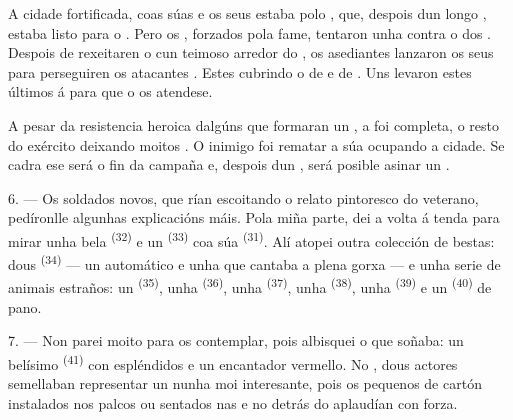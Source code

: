 A cidade fortificada, coas súas  e os seus  estaba
 polo , que, despois dun longo
, estaba listo para o . Pero os ,
forzados pola fame, tentaron unha  contra o  dos
. Despois de rexeitaren o  cun 
teimoso arredor do , os asediantes  lanzaron os
seus  para perseguiren os atacantes . Estes
 cubrindo o  de  e de
. Uns  levaron estes últimos á 
para que o  os atendese.

A pesar da resistencia heroica dalgúns  que formaran un
, a  foi completa, o resto do exército 
deixando moitos . O inimigo foi rematar a súa 
ocupando a cidade. Se cadra ese será o fin da campaña e, despois dun
, será posible asinar un .

\VUsaut{4.4mm}
\VUsaut{2.8mm}

6. --- Os soldados novos, que rían escoitando o relato pintoresco do veterano,
pedíronlle algunhas explicacións máis. Pola miña parte, dei a volta á tenda para mirar
unha bela  \textsuperscript{(32)} e un 
\textsuperscript{(33)} coa súa  \textsuperscript{(31)}. Alí atopei
outra colección de bestas: dous  \textsuperscript{(34)} ---
un  automático e unha  que cantaba a plena gorxa ---
e unha serie de animais estraños: un  \textsuperscript{(35)}, unha
 \textsuperscript{(36)}, unha 
\textsuperscript{(37)}, unha  \textsuperscript{(38)}, unha
 \textsuperscript{(39)} e un  \textsuperscript{(40)} de
pano.

7. --- Non parei moito para os contemplar, pois albisquei o que soñaba: un
belísimo  \textsuperscript{(41)} con espléndidos
 e un encantador  vermello. No , dous
actores semellaban representar un  nunha  moi interesante,
pois os pequenos  de cartón instalados nos palcos ou sentados nas
 e no  detrás do 
aplaudían con forza.

